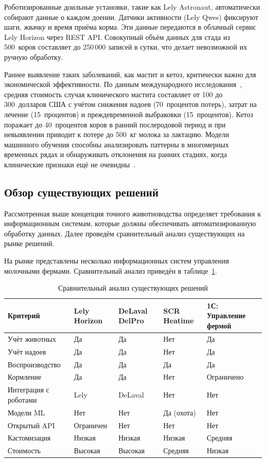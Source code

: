 Роботизированные доильные установки, такие как Lely Astronaut, автоматически собирают данные о каждом доении. Датчики активности (Lely Qwes) фиксируют шаги, жвачку и время приёма корма. Эти данные передаются в облачный сервис Lely Horizon через REST API. Совокупный объём данных для стада из 500~коров составляет до 250\,000 записей в сутки, что делает невозможной их ручную обработку.

Раннее выявление таких заболеваний, как мастит и кетоз, критически важно для экономической эффективности. По данным международного исследования~\cite{MastitisDetection}, средняя стоимость случая клинического мастита составляет от 100 до 300~долларов США с учётом снижения надоев (70~процентов потерь), затрат на лечение (15~процентов) и преждевременной выбраковки (15~процентов). Кетоз поражает до 40~процентов коров в ранний послеродовой период и при невыявлении приводит к потере до 500~кг молока за лактацию. Модели машинного обучения способны анализировать паттерны в многомерных временных рядах и обнаруживать отклонения на ранних стадиях, когда клинические признаки ещё не очевидны~\cite{MastitisDetection}.

\subsection{Обзор существующих решений}

Рассмотренная выше концепция точного животноводства определяет требования к информационным системам, которые должны обеспечивать автоматизированную обработку данных. Далее проведём сравнительный анализ существующих на рынке решений.

На рынке представлены несколько информационных систем управления молочными фермами. Сравнительный анализ приведён в таблице~\ref{solcompare}.

\begin{table}
  \caption{Сравнительный анализ существующих решений}
  \small
  \begin{tabularx}{\textwidth}{|p{3.3cm}|X|X|X|X|}
    \hline
    \textbf{Критерий} & \textbf{Lely Horizon} & \textbf{DeLaval DelPro} & \textbf{SCR Heatime} & \textbf{1С: Управление фермой} \\
    \hline
    Учёт животных & Да & Да & Нет & Да \\
    \hline
    Учёт надоев & Да & Да & Нет & Да \\
    \hline
    Воспроизводство & Да & Да & Да & Да \\
    \hline
    Кормление & Да & Да & Нет & Ограничено \\
    \hline
    Интеграция с роботами & Lely & DeLaval & Нет & Нет \\
    \hline
    Модели ML & Нет & Нет & Да (охота) & Нет \\
    \hline
    Открытый API & Ограничен & Нет & Нет & Нет \\
    \hline
    Кастомизация & Низкая & Низкая & Низкая & Средняя \\
    \hline
    Стоимость & Высокая & Высокая & Средняя & Низкая \\
    \hline
  \end{tabularx}
  \label{solcompare}
\end{table}

